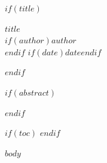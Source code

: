 \documentclass[$if(fontsize)$$fontsize$$else$11pt$endif$,$if(papersize)$$papersize$$else$a4paper$endif$]{article}
\begin{document}
$if(title)$
\begin{center}
  {\LARGE\bfseries $title$}\\[0.8em]
  $if(author)${\large $author$}\\[0.4em]$endif$
  $if(date)${\normalsize $date$}$endif$
\end{center}
\vspace{1em}
$endif$

$if(abstract)$
\begin{abstract}
  \noindent $abstract$
\end{abstract}
\vspace{1em}
$endif$

$if(toc)$
\tableofcontents
\newpage
$endif$

$body$
\end{document}

